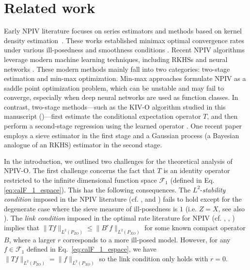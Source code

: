\documentclass[11pt]{article}
\newcommand{\calF}{\mathcal{F}}
\newcommand{\0}{\mathbf{0}}
\begin{document}
\section{Related work}\label{sec:related_work}
Early NPIV literature focuses on series estimators \citep{newey_2003, blundell2007semi, chen2007large, horowitz2011applied} and methods based on kernel density estimation~\citep{HallHorowitz2005, darolles2011nonparametric, florens2011identification}.
These works established minimax optimal convergence rates under various ill-posedness and smoothness conditions \citep{HallHorowitz2005, chen2011rate, Chen_2018}. 
Recent NPIV algorithms leverage modern machine learning techniques, including RKHSs \citep{singh2019kernel,zhang2023instrumental, meunier2024nonparametricinstrumentalregressionkernel} and neural networks \citep{hartford2017deep, bennett2019deep, xu2020learning, petrulionyte2024functional, kim2025optimality,sun2025spectral,meunier2025demystifying}. 
These modern methods mainly fall into two categories: two-stage estimation and min-max optimization. Min-max approaches \citep{bennett2019deep, dikkala2020minimax, liao2020provably, bennett2023minimax, zhang2023instrumental, wang2022spectral} formulate NPIV as a saddle point optimization problem, which can be unstable
and may fail to converge, especially when deep neural networks are used as function classes. 
In contrast, two-stage methods—such as the KIV-O algorithm studied in this manuscript ()—first estimate the conditional expectation operator $T$, and then perform a second-stage regression using the learned operator \citep{hartford2017deep, singh2019kernel, xu2020learning, li2024regularized, kim2025optimality}.
One recent paper~\citep{kankanala2025generalized} employs a sieve estimator in the first stage and a Gaussian process (a Bayesian analogue of an RKHS) estimator in the second stage. 

In the introduction, we outlined two challenges for the theoretical analysis of NPIV-O. The first challenge concerns the fact that $T$ is an identity operator restricted to the infinite dimensional function space $\calF_1$ (defined in Eq. \eqref{eq:calF_1_espace}). This has the following consequences. The $L^2$-\emph{stability condition} imposed in the NPIV literature (cf. \citet[Assumption 6]{blundell2007semi}, \citet[Assumption 5.2(ii)]{chen2012estimation} and \citet[Assumption 4.2]{Chen_2018}) fails to hold except for the degenerate case where the sieve measure of ill-posedness is $1$ (i.e. $Z=X$, see also ). The \emph{link condition} imposed in the optimal rate literature for NPIV (cf. \citet{HallHorowitz2005}, \citet[Assumption 2.2]{chen2011rate}, \citet[Condition LB]{Chen_2018}) implies that $\|T f\|_{L^2 (P_{Z O})} \leq \|B^r f\|_{L^2(P_{X O})}$ for some known compact operator $B$, where a larger $r$ corresponds to a more ill-posed model. However, for any $f \in \mathcal{F}_1$ defined in Eq.~\eqref{eq:calF_1_espace}, we have $
\|T f\|_{L^2(P_{Z O})}=\|f\|_{L^2(P_{X O})}$ so the link condition only holds with $r = 0$.
\end{document}
